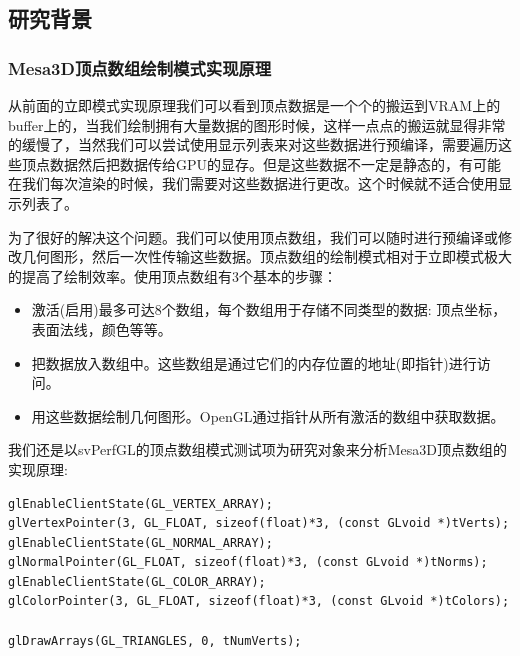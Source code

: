 
\subsection{研究背景}

\subsubsection{Mesa3D顶点数组绘制模式实现原理}
从前面的立即模式实现原理我们可以看到顶点数据是一个个的搬运到VRAM上的buffer上的，当我们绘制拥有大量数据的图形时候，这样一点点的搬运就显得非常的缓慢了，当然我们可以尝试使用显示列表来对这些数据进行预编译，需要遍历这些顶点数据然后把数据传给GPU的显存。但是这些数据不一定是静态的，有可能在我们每次渲染的时候，我们需要对这些数据进行更改。这个时候就不适合使用显示列表了。

为了很好的解决这个问题。我们可以使用顶点数组，我们可以随时进行预编译或修改几何图形，然后一次性传输这些数据。顶点数组的绘制模式相对于立即模式极大的提高了绘制效率。使用顶点数组有3个基本的步骤：

\begin{itemize}
\item{} 激活(启用)最多可达8个数组，每个数组用于存储不同类型的数据: 顶点坐标，表面法线，颜色等等。
\item{} 把数据放入数组中。这些数组是通过它们的内存位置的地址(即指针)进行访问。
\item{} 用这些数据绘制几何图形。OpenGL通过指针从所有激活的数组中获取数据。
\end{itemize}

我们还是以svPerfGL的顶点数组模式测试项为研究对象来分析Mesa3D顶点数组的实现原理:

\begin{lstlisting}
glEnableClientState(GL_VERTEX_ARRAY);
glVertexPointer(3, GL_FLOAT, sizeof(float)*3, (const GLvoid *)tVerts);
glEnableClientState(GL_NORMAL_ARRAY);
glNormalPointer(GL_FLOAT, sizeof(float)*3, (const GLvoid *)tNorms);
glEnableClientState(GL_COLOR_ARRAY);
glColorPointer(3, GL_FLOAT, sizeof(float)*3, (const GLvoid *)tColors);

glDrawArrays(GL_TRIANGLES, 0, tNumVerts);
\end{lstlisting}

